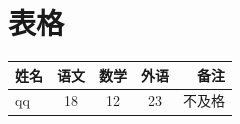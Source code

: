 \documentclass{article}  %
\begin{document}
\section{表格}
\begin{tabular}{l  c  c  c  r}
姓名 & 语文 & 数学 & 外语 & 备注 \\
\hline
qq & 18 & 12 & 23 & 不及格


\end{tabular}
\end{document}
